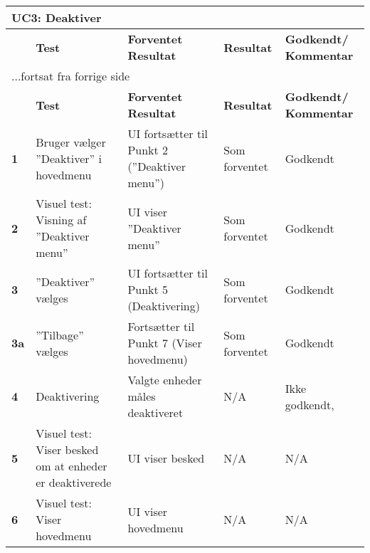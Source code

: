 
\begin{center}
\begin{longtable}{|p{}|p{}|p{}|p{}|p{}|} %
\hline
\multicolumn{5}{|l|}{\textbf{UC3: Deaktiver}} \\ \hline
\multicolumn{1}{|c|}{} &
\textbf{Test} &
\textbf{Forventet \newline Resultat} &
\textbf{Resultat} &
\textbf{Godkendt/ \newline Kommentar} \\ \hline 
\endfirsthead

\multicolumn{5}{l}{...fortsat fra forrige side} \\ \hline 
\multicolumn{1}{|c|}{} &
\textbf{Test} &
\textbf{Forventet \newline Resultat} &
\textbf{Resultat} &
\textbf{Godkendt/ \newline Kommentar} \\ \hline 
\endhead


		
\textbf{1}			&Bruger vælger ''Deaktiver'' i hovedmenu															
					&UI fortsætter til Punkt 2 (''Deaktiver menu'')
					&Som \newline forventet
					&Godkendt \\\hline
					
\textbf{2}			&Visuel test: Visning af ''Deaktiver menu''																
					&UI viser ''Deaktiver menu''
					&Som \newline forventet
					&Godkendt \\\hline

\textbf{3}			&''Deaktiver'' vælges			
					&UI fortsætter til Punkt 5 (Deaktivering)
					&Som \newline forventet
					&Godkendt \\\hline
					
\textbf{3a}			&''Tilbage'' vælges			
					&Fortsætter til Punkt 7 (Viser hovedmenu)
					&Som \newline forventet
					&Godkendt \\\hline

\textbf{4}			&Deaktivering			
					&Valgte enheder måles deaktiveret
					&N/A 
					&Ikke godkendt,  \\\hline
		
\textbf{5}			&Visuel test: Viser besked om at enheder er deaktiverede
					&UI viser besked
					&N/A
					&N/A \\\hline
					
\textbf{6}			&Visuel test: Viser hovedmenu
					&UI viser hovedmenu
					&N/A
					&N/A \\\hline
					

	\end{longtable}
	\label{ATUC3} 
\end{center}
